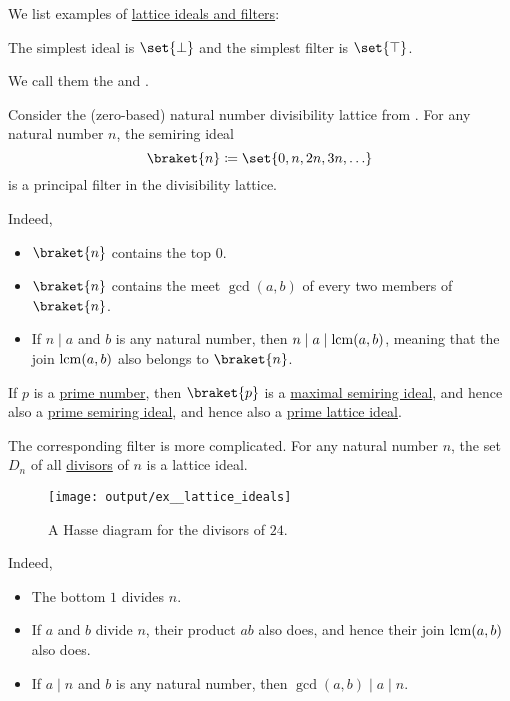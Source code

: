 \begin{example}\label{ex:def:lattice_ideal}
  We list examples of \hyperref[def:lattice_ideal]{lattice ideals and filters}:
  \begin{thmenum}
     The simplest ideal is \( \set{ \bot } \) and the simplest filter is \( \set{ \top } \).

    We call them the  and .

     Consider the (zero-based) natural number divisibility lattice from . For any natural number \( n \), the semiring ideal
    \begin{equation*}
      \braket{ n } \coloneqq \set{ 0, n, 2n, 3n, \ldots }
    \end{equation*}
    is a principal filter in the divisibility lattice.

    Indeed,
    \begin{itemize}
      \item \( \braket{ n } \) contains the top \( 0 \).
      \item \( \braket{ n } \) contains the meet \( \gcd(a, b) \) of every two members of \( \braket{ n } \).
      \item If \( n \mid a \) and \( b \) is any natural number, then \( n \mid a \mid \operatorname{lcm}(a, b) \), meaning that the join \( \operatorname{lcm}(a, b) \) also belongs to \( \braket{ n } \).
    \end{itemize}

    If \( p \) is a \hyperref[def:prime_number]{prime number}, then \( \braket{ p } \) is a \hyperref[def:semiring_ideal/maximal]{maximal semiring ideal}, and hence also a \hyperref[def:semiring_ideal/prime]{prime semiring ideal}, and hence also a \hyperref[def:lattice_ideal/prime]{prime lattice ideal}.

    The corresponding filter is more complicated. For any natural number \( n \), the set \( D_n \) of all \hyperref[def:divisibility]{divisors} of \( n \) is a lattice ideal.

    \begin{figure}[!ht]
      \centering
      \texttt{[image: output/ex\_\_lattice\_ideals]}
      \caption{A Hasse diagram for the divisors of \( 24 \).}
      \label{fig:ex:def:lattice_ideal/lattice}
    \end{figure}

    Indeed,
    \begin{itemize}
      \item The bottom \( 1 \) divides \( n \).
      \item If \( a \) and \( b \) divide \( n \), their product \( ab \) also does, and hence their join \( \operatorname{lcm}(a, b) \) also does.
      \item If \( a \mid n \) and \( b \) is any natural number, then \( \gcd(a, b) \mid a \mid n \).
    \end{itemize}


\end{thmenum}
\end{example}
